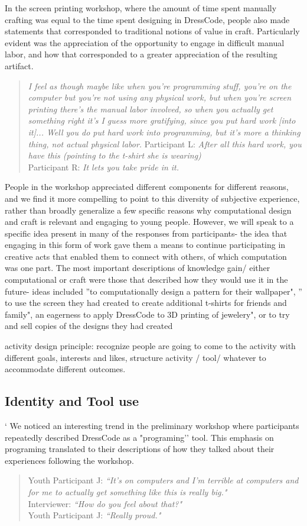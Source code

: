 \documentclass{sigchi}
\begin{document}
In the screen printing workshop, where the amount of time spent manually crafting was equal to the time spent designing in DressCode, people also made statements that corresponded to traditional notions of value in craft. Particularly evident was the appreciation of the opportunity to engage in difficult manual labor, and how that corresponded to a greater appreciation of the resulting artifact.
\begin{quotation}
\textit{I feel as though maybe like when you're programming stuff, you're on the computer but you're not using any physical work, but when you're screen printing there's the manual labor involved, so when you actually get something right it's I guess more gratifying, since you put hard work [into it]... Well you do put hard work into programming, but it's more a thinking thing, not actual physical labor.}
Participant L: \textit{After all this hard work, you have this (pointing to the t-shirt she is wearing)}
\\Participant R: \textit{It lets you take pride in it.}
\end{quotation}

People in the workshop appreciated different components for different reasons, and we find it more compelling to point to this diversity of subjective experience, rather than broadly generalize a few specific reasons why computational design and craft is relevant and engaging to young people. However, we will speak to a specific idea present in many of the responses from participants- the idea that engaging in this form of work gave them a means to continue participating in creative acts that enabled them to connect with others, of which computation was one part. The most important descriptions of knowledge gain/ either computational or craft were those that described how they would use it in the future- ideas included ''to computationally design a pattern for their wallpaper", '' to use the screen they had created to create additional t-shirts for friends and family", an eagerness to apply DressCode to 3D printing of jewelery", or to try and sell copies of the designs they had created

activity design principle: recognize people are going to come to the activity with different goals, interests and likes, structure activity / tool/ whatever to accommodate different outcomes. 

\subsection{Identity and Tool use}
` We noticed an interesting trend in the preliminary workshop where participants repeatedly described DressCode as a "programing'' tool. This emphasis on programing translated to their descriptions of how they talked about their experiences following the workshop.
 \begin{quotation}
Youth Participant J: \textit{``It's on computers and I'm terrible at computers and for me to actually get something like this is really big."} 
\\Interviewer:  \textit{``How do you feel about that?"}
\\Youth Participant J:  \textit{``Really proud."} 
\end{quotation}
\end{document}
